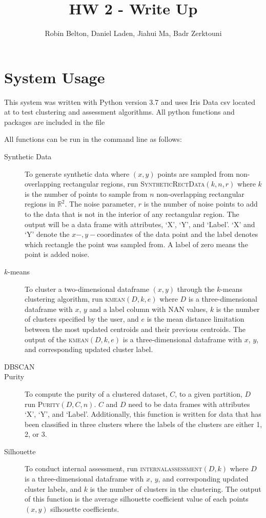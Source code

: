 \documentclass[psamsfonts,onesided,10pt]{amsart}
\title{HW 2 - Write Up}
\author{Robin Belton, Daniel Laden, Jiahui Ma,  Badr Zerktouni}
\begin{document}
\maketitle

\section{System Usage}

This system was written with Python version 3.7 and uses Iris Data csv located at  
to test clustering and assessment algorithms. All python functions and packages are included in the  file 

All functions can be run in the command line as follows:

\begin{description}
\item[Synthetic Data] To generate synthetic data where $(x,y)$ points are sampled from 
non-overlapping rectangular regions, run \textsc{SyntheticRectData}$(k,n,r)$ where $k$ is the 
number of points to sample from $n$ non-overlapping rectangular regions in $\mathbb{R}^2$. 
The noise parameter, $r$  is the number of noise points to add to the data that is not in the interior 
of any rectangular region. The output will be a data frame with attributes, `X', `Y', and `Label'. 
`X' and `Y' denote the $x-,y-$coordinates of the data point and the label denotes which rectangle 
the point was sampled from. A label of zero means the point is added noise.
\item[$k$-means] To cluster a two-dimensional dataframe $(x,y)$ through the $k$-means 
clustering algorithm, run \textsc{kmean}$(D,k,e)$ where $D$ is a three-dimensional dataframe with 
$x$, $y$ and a label column with NAN values, $k$ is the number of clusters specified by the user, 
and $e$ is the mean distance limitation between the most updated centroids and their previous 
centroids. The output of the \textsc{kmean}$(D,k,e)$ is a three-dimensional dataframe with $x$, $y$, 
and corresponding updated cluster label.
\item[DBSCAN] \todo{}
\item[Purity]  To compute the purity of a clustered dataset, $C$, to a given partition, $D$ run 
\textsc{Purity}$(D, C, n)$. $C$ and $D$ need to be data frames with 
attributes `X',  `Y', and `Label'. Additionally, this function is written for data that has been 
classified in three clusters where the labels of the clusters are either 1, 2, or 3. 
\item[Silhouette] To conduct internal assessment, run \textsc{internalassessment}$(D,k)$ 
where $D$ is a three-dimensional dataframe with $x$, $y$, and corresponding updated cluster 
labels, and $k$ is the number of clusters in the clustering. The output of this function is the 
average silhouette coefficient value of each points $(x,y)$ silhouette coefficients. 
\end{description}
 
\end{document}
